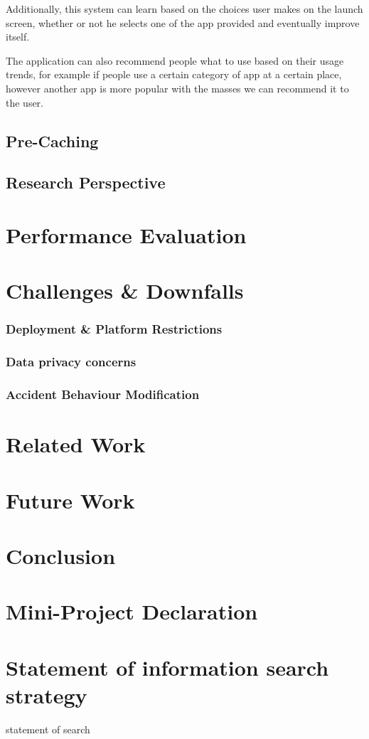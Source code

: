 \documentclass[12pt]{report}
\begin{document}
Additionally, this system can learn based on the choices user makes on the launch screen, whether or not he selects one of the app provided and eventually improve itself.

The application can also recommend people what to use based on their usage trends, for example if people use a certain category of app at a certain place, however another app is more popular with the masses we can recommend it to the user.

\section{Pre-Caching}
\section{Research Perspective}

\chapter{Performance Evaluation}
\chapter{Challenges \& Downfalls}
\label{challenges}
\subsection{Deployment \& Platform Restrictions}
\subsection{Data privacy concerns}
\subsection{Accident Behaviour Modification}
\chapter{Related Work}
\chapter{Future Work}
\chapter{Conclusion}




\appendix
\chapter{Mini-Project Declaration}


\chapter{Statement of information search strategy}

statement of search
\end{document}
